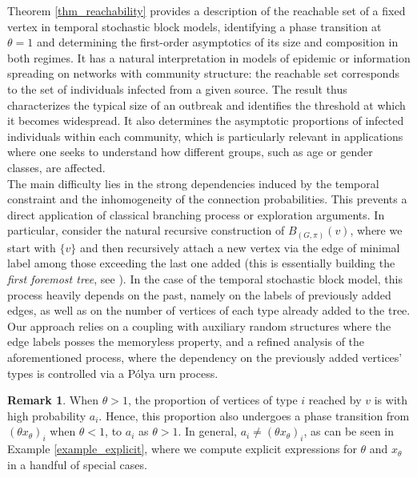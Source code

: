 \documentclass[11pt]{article}
\numberwithin{equation}{section}
\theoremstyle{definition}
\newtheorem{remark}[theorem]{Remark}
\begin{document}
Theorem \ref{thm_reachability} provides a description of the reachable set of a fixed vertex in temporal stochastic block models, identifying a phase transition at $\theta = 1$ and determining the first-order asymptotics of its size and composition in both regimes. It has a natural interpretation in models of epidemic or information spreading on networks with community structure: the reachable set corresponds to the set of individuals infected from a given source. The result thus characterizes the typical size of an outbreak and identifies the threshold at which it becomes widespread. It also determines the asymptotic proportions of infected individuals within each community, which is particularly relevant in applications where one seeks to understand how different groups, such as age or gender classes, are affected. \\
\indent The main difficulty lies in the strong dependencies induced by the temporal constraint and the inhomogeneity of the connection probabilities. This prevents a direct application of classical branching process or exploration arguments. In particular, consider the natural recursive construction of $B_{(G,\pi)}(v)$, where we start with $\{v\}$ and then recursively attach a new vertex via the edge of minimal label among those exceeding the last one added (this is essentially building the \emph{first foremost tree}, see \cite{CRRZ24}). In the case of the temporal stochastic block model, this process heavily depends on the past, namely on the labels of previously added edges, as well as on the number of vertices of each type already added to the tree. Our approach relies on a coupling with auxiliary random structures where the edge labels posses the memoryless property, and a refined analysis of the aforementioned process, where the dependency on the previously added vertices' types is controlled via a P\'olya urn process. 

\begin{remark} When $\theta > 1$, the proportion of vertices of type $i$ reached by $v$ is with high probability $a_i$. Hence, this proportion also undergoes a phase transition from $(\theta x_\theta)_i$ when $\theta < 1$, to $a_i$ as $\theta > 1$. In general, $a_i \neq (\theta x_\theta)_i$, as can be seen in Example \ref{example_explicit}, where we compute explicit expressions for $\theta$ and $x_\theta$ in a handful of special cases. %
\end{remark}
\end{document}
